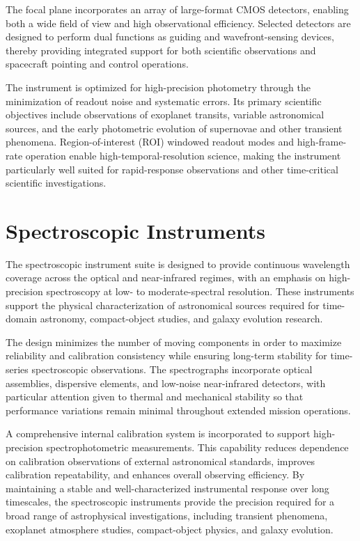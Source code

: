 The focal plane incorporates an array of large-format CMOS detectors, enabling both a wide field of view and high observational efficiency. Selected detectors are designed to perform dual functions as guiding and wavefront-sensing devices, thereby providing integrated support for both scientific observations and spacecraft pointing and control operations.

The instrument is optimized for high-precision photometry through the minimization of readout noise and systematic errors. Its primary scientific objectives include observations of exoplanet transits, variable astronomical sources, and the early photometric evolution of supernovae and other transient phenomena. Region-of-interest (ROI) windowed readout modes and high-frame-rate operation enable high-temporal-resolution science, making the instrument particularly well suited for rapid-response observations and other time-critical scientific investigations.

\section{Spectroscopic Instruments}\label{spectroscopic-instruments}

The spectroscopic instrument suite is designed to provide continuous wavelength coverage across the optical and near-infrared regimes, with an emphasis on high-precision spectroscopy at low- to moderate-spectral resolution. These instruments support the physical characterization of astronomical sources required for time-domain astronomy, compact-object studies, and galaxy evolution research. 

The design minimizes the number of moving components in order to maximize reliability and calibration consistency while ensuring long-term stability for time-series spectroscopic observations. The spectrographs incorporate optical assemblies, dispersive elements, and low-noise near-infrared detectors, with particular attention given to thermal and mechanical stability so that performance variations remain minimal throughout extended mission operations.

A comprehensive internal calibration system is incorporated to support high-precision spectrophotometric measurements. This capability reduces dependence on calibration observations of external astronomical standards, improves calibration repeatability, and enhances overall observing efficiency. By maintaining a stable and well-characterized instrumental response over long timescales, the spectroscopic instruments provide the precision required for a broad range of astrophysical investigations, including transient phenomena, exoplanet atmosphere studies, compact-object physics, and galaxy evolution. 

